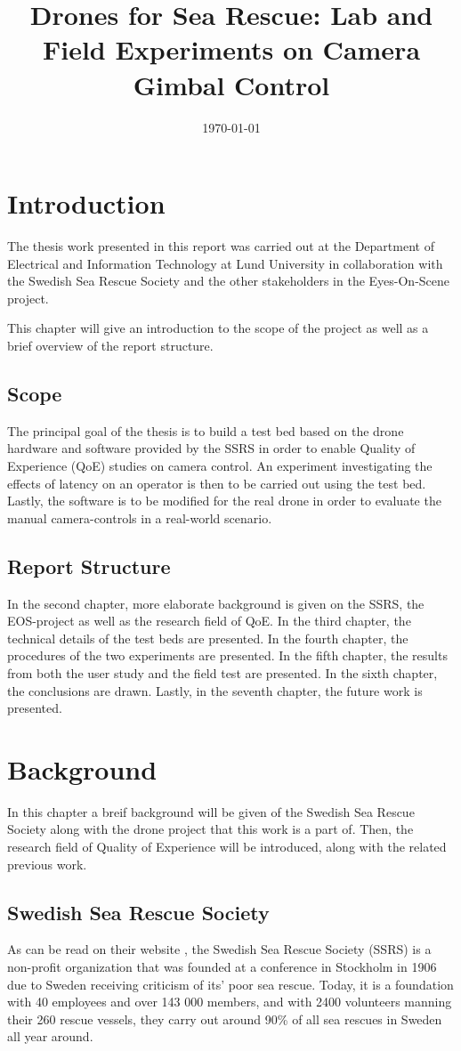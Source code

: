 \documentclass[nofilelist]{cslthse-msc}
\title{Drones for Sea Rescue: Lab and Field Experiments on Camera Gimbal Control}
\date{\today}
\begin{document}
\renewcommand{\bibname}{References}

\makefrontmatter
\chapter{Introduction}
The thesis work presented in this report was carried out at the Department of Electrical and Information Technology at Lund University in collaboration with the Swedish Sea Rescue Society and the other stakeholders in the Eyes-On-Scene project. 

This chapter will give an introduction to the scope of the project as well as a brief overview of the report structure.

\section{Scope}
The principal goal of the thesis is to build a test bed based on the drone hardware and software provided by the SSRS in order to enable Quality of Experience (QoE) studies on camera control. An experiment investigating the effects of latency on an operator is then to be carried out using the test bed. Lastly, the software is to be modified for the real drone in order to evaluate the manual camera-controls in a real-world scenario.

\section{Report Structure}
In the second chapter, more elaborate background is given on the SSRS, the EOS-project as well as the research field of QoE. In the third chapter, the technical details of the test beds are presented. In the fourth chapter, the procedures of the two experiments are presented. In the fifth chapter, the results from both the user study and the field test are presented. In the sixth chapter, the conclusions are drawn. Lastly, in the seventh chapter, the future work is presented.

\chapter{Background}
In this chapter a breif background will be given of the Swedish Sea Rescue Society along with the drone project that this work is a part of. Then, the research field of Quality of Experience will be introduced, along with the related previous work.

\section{Swedish Sea Rescue Society}
As can be read on their website \cite{ssrs}, the Swedish Sea Rescue Society (SSRS) is a non-profit organization that was founded at a conference in Stockholm in 1906 due to Sweden receiving criticism of its' poor sea rescue. Today, it is a foundation with 40 employees and over 143 000 members, and with 2400 volunteers manning their 260 rescue vessels, they carry out around 90\% of all sea rescues in Sweden all year around.
\end{document}

